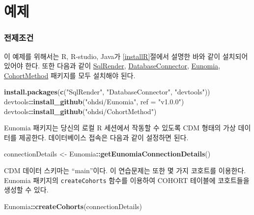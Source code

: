 \documentclass[11pt]{book}
\newenvironment{Shaded}{\begin{snugshade}}{\end{snugshade}}
\newcommand{\KeywordTok}[1]{\textcolor[rgb]{0.13,0.29,0.53}{\textbf{#1}}}
\newcommand{\DataTypeTok}[1]{\textcolor[rgb]{0.13,0.29,0.53}{#1}}
\newcommand{\StringTok}[1]{\textcolor[rgb]{0.31,0.60,0.02}{#1}}
\newcommand{\OperatorTok}[1]{\textcolor[rgb]{0.81,0.36,0.00}{\textbf{#1}}}
\newcommand{\NormalTok}[1]{#1}
\theoremstyle{definition}
\theoremstyle{definition}
\theoremstyle{definition}
\theoremstyle{remark}
\begin{document}
\section{예제}\label{-6}

\subsubsection*{전제조건}\label{-5}

이 예제를 위해서는 R, R-studio, Java가 \ref{installR}절에서 설명한 바와
같이 설치되어 있어야 한다. 또한 다음과 같이
\href{https://ohdsi.github.io/SqlRender/}{SqlRender},
\href{https://ohdsi.github.io/DatabaseConnector/}{DatabaseConnector},
\href{https://ohdsi.github.io/Eunomia/}{Eunomia},
\href{https://ohdsi.github.io/CohortMethod/}{CohortMethod} 패키지를 모두
설치해야 된다.

\begin{Shaded}
\begin{Highlighting}[]
\KeywordTok{install.packages}\NormalTok{(}\KeywordTok{c}\NormalTok{(}\StringTok{"SqlRender"}\NormalTok{, }\StringTok{"DatabaseConnector"}\NormalTok{, }\StringTok{"devtools"}\NormalTok{))}
\NormalTok{devtools}\OperatorTok{::}\KeywordTok{install_github}\NormalTok{(}\StringTok{"ohdsi/Eunomia"}\NormalTok{, }\DataTypeTok{ref =} \StringTok{"v1.0.0"}\NormalTok{)}
\NormalTok{devtools}\OperatorTok{::}\KeywordTok{install_github}\NormalTok{(}\StringTok{"ohdsi/CohortMethod"}\NormalTok{)}
\end{Highlighting}
\end{Shaded}

Eunomia 패키지는 당신의 로컬 R 세션에서 작동할 수 있도록 CDM 형태의 가상
데이터를 제공한다. 데이터베이스 접속은 다음과 같이 설정하면 된다.

\begin{Shaded}
\begin{Highlighting}[]
\NormalTok{connectionDetails <-}\StringTok{ }\NormalTok{Eunomia}\OperatorTok{::}\KeywordTok{getEunomiaConnectionDetails}\NormalTok{()}
\end{Highlighting}
\end{Shaded}

CDM 데이터 스키마는 ``main''이다. 이 연습문제는 또한 몇 가지 코호트를
이용한다. Eunomia 패키지의 \texttt{createCohorts} 함수를 이용하여 COHORT
테이블에 코호트들을 생성할 수 있다.

\begin{Shaded}
\begin{Highlighting}[]
\NormalTok{Eunomia}\OperatorTok{::}\KeywordTok{createCohorts}\NormalTok{(connectionDetails)}
\end{Highlighting}
\end{Shaded}
\end{document}
